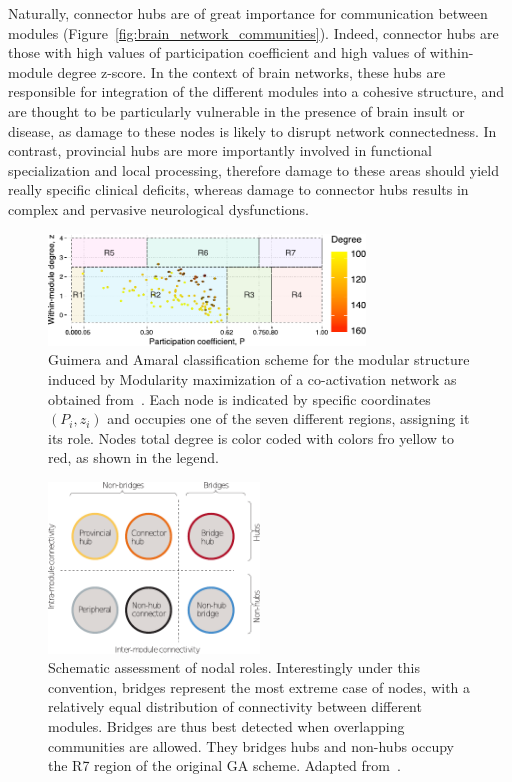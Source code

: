Naturally, connector hubs are of great importance for communication between modules (Figure~\ref{fig:brain_network_communities}).
Indeed, connector hubs are those with high values of participation coefficient and high values of within-module degree z-score.
In the context of brain networks, these hubs are responsible for integration of the different modules into a cohesive structure, and are thought to be particularly vulnerable in the presence of brain insult or disease, as damage to these nodes is likely to disrupt network connectedness.
In contrast, provincial hubs are more importantly involved in functional specialization and local processing, therefore damage to these areas should yield really specific clinical deficits, whereas damage to connector hubs results in complex and pervasive neurological dysfunctions.


\begin{figure}[htb!]
\centering
\includegraphics[width=0.75\textwidth]{images/guimera_amaral_coact_q.pdf}
\caption{Guimera and Amaral classification scheme for the modular structure induced by Modularity maximization of a co-activation network as obtained from~\cite{crossley2013a}. Each node is indicated by specific coordinates $(P_i,z_i)$ and occupies one of the seven different regions, assigning it its role. Nodes total degree is color coded with colors fro yellow to red, as shown in the legend.}
\label{fig:gagraph}
\end{figure}

\begin{figure}[htb!]
\centering
\includegraphics[width=0.5\textwidth]{images/hubs_nonhubs.pdf}
\caption{Schematic assessment of nodal roles. Interestingly under this convention, bridges represent the most extreme case of nodes, with a relatively equal distribution of connectivity between different modules. Bridges are thus best detected when overlapping communities are allowed. They bridges hubs and non-hubs occupy the R7 region of the original GA scheme. Adapted from~\cite{fornito2015}.}
\label{fig:hubs_bridges}
\end{figure}

